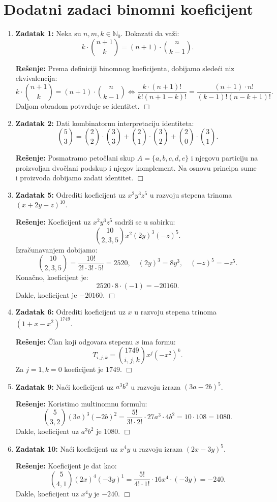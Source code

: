 \documentclass{article}
\begin{document}
\section*{Dodatni zadaci binomni koeficijent}

\begin{enumerate}
    \item \textbf{Zadatak 1:} Neka su $n,m,k \in \mathbb{N}_0$. Dokazati da važi:
    \[
    k \cdot \binom{n+1}{k} = (n+1) \cdot \binom{n}{k-1}.
    \]

    \textbf{Rešenje:} Prema definiciji binomnog koeficijenta, dobijamo sledeći niz ekvivalencija:
    \[
    k \cdot \binom{n+1}{k} = (n+1) \cdot \binom{n}{k-1} \iff
    \frac{k \cdot (n+1)!}{k!(n+1-k)!} = \frac{(n+1) \cdot n!}{(k-1)!(n-k+1)!}.
    \]
    Daljom obradom potvrđuje se identitet. $\Box$

    \item \textbf{Zadatak 2:} Dati kombinatornu interpretaciju identiteta:
    \[
    \binom{5}{3} = \binom{2}{2} \cdot \binom{3}{3} + \binom{2}{1} \cdot \binom{3}{2} + \binom{2}{0} \cdot \binom{3}{1}.
    \]

    \textbf{Rešenje:} Posmatramo petočlani skup $A = \{a, b, c, d, e\}$ i njegovu particiju na proizvoljan dvočlani podskup i njegov komplement. Na osnovu principa sume i proizvoda dobijamo zadati identitet. $\Box$

    \item \textbf{Zadatak 5:} Odrediti koeficijent uz $x^2y^3z^5$ u razvoju stepena trinoma $(x+2y-z)^{10}$.

    \textbf{Rešenje:} Koeficijent uz $x^2y^3z^5$ sadrži se u sabirku:
    \[
    \binom{10}{2,3,5} x^2(2y)^3(-z)^5.
    \]
    Izračunavanjem dobijamo:
    \[
    \binom{10}{2,3,5} = \frac{10!}{2! \cdot 3! \cdot 5!} = 2520, \quad (2y)^3 = 8y^3, \quad (-z)^5 = -z^5.
    \]
    Konačno, koeficijent je:
    \[
    2520 \cdot 8 \cdot (-1) = -20160.
    \]
    Dakle, koeficijent je $-20160$. $\Box$

    \item \textbf{Zadatak 6:} Odrediti koeficijent uz $x$ u razvoju stepena trinoma $(1 + x - x^2)^{1749}$.

    \textbf{Rešenje:} Član koji odgovara stepenu $x$ ima formu:
    \[
    T_{i,j,k} = \binom{1749}{i,j,k} x^j(-x^2)^k.
    \]
    Za $j=1, k=0$ koeficijent je $1749$. $\Box$

    \item \textbf{Zadatak 9:} Naći koeficijent uz $a^3b^2$ u razvoju izraza $(3a-2b)^5$.

    \textbf{Rešenje:} Koristimo multinomnu formulu:
    \[
    \binom{5}{3,2}(3a)^3(-2b)^2 = \frac{5!}{3! \cdot 2!} \cdot 27a^3 \cdot 4b^2 = 10 \cdot 108 = 1080.
    \]
    Dakle, koeficijent uz $a^3b^2$ je $1080$. $\Box$

    \item \textbf{Zadatak 10:} Naći koeficijent uz $x^4y$ u razvoju izraza $(2x-3y)^5$.

    \textbf{Rešenje:} Koeficijent je dat kao:
    \[
    \binom{5}{4,1}(2x)^4(-3y)^1 = \frac{5!}{4! \cdot 1!} \cdot 16x^4 \cdot (-3y) = -240.
    \]
    Dakle, koeficijent uz $x^4y$ je $-240$. $\Box$

\end{enumerate}
\end{document}
